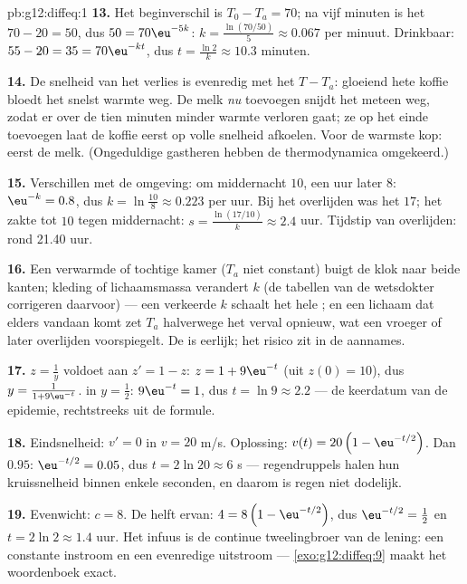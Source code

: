 \begin{solution}{pb:g12:diffeq:1}
\textbf{13.} Het beginverschil is $T_0 - T_a = 70$; na vijf minuten is het
 $70 - 20 = 50$, dus $50 = 70\eu^{-5k}$:
$k = \frac{\ln(70/50)}{5} \approx 0.067$ per minuut. Drinkbaar:
$55 - 20 = 35 = 70\eu^{-kt}$, dus $t = \frac{\ln 2}{k} \approx 10.3$
minuten.

\textbf{14.} De snelheid van het verlies is evenredig met het 
$T - T_a$: gloeiend hete koffie bloedt het snelst warmte weg. De melk
\emph{nu} toevoegen snijdt het  meteen weg, zodat er over de tien
minuten minder warmte verloren gaat; ze op het einde toevoegen laat de koffie
eerst op volle snelheid afkoelen. Voor de warmste kop: eerst de melk.
(Ongeduldige gastheren hebben de thermodynamica omgekeerd.)

\textbf{15.} Verschillen met de omgeving: om middernacht $10$, een uur later
$8$: $\eu^{-k} = 0.8$, dus $k = \ln\frac{10}{8} \approx 0.223$ per uur. Bij
het overlijden was het  $17$; het zakte tot $10$ tegen middernacht:
$s = \frac{\ln(17/10)}{k} \approx 2.4$ uur. Tijdstip van overlijden: rond
21.40 uur.

\textbf{16.} Een verwarmde of tochtige kamer ($T_a$ niet constant) buigt de
klok naar beide kanten; kleding of lichaamsmassa verandert $k$ (de tabellen
van de wetsdokter corrigeren daarvoor) --- een verkeerde $k$ schaalt het hele
; en een lichaam dat elders vandaan komt zet $T_a$ halverwege het
verval opnieuw, wat een vroeger of later overlijden voorspiegelt. De
 is eerlijk; het risico zit in de aannames.

\textbf{17.} $z = \frac1y$ voldoet aan $z' = 1 - z$: $z = 1 + 9\eu^{-t}$
(uit $z(0) = 10$), dus $y = \frac{1}{1 + 9\eu^{-t}}$.  in
$y = \frac12$: $9\eu^{-t} = 1$, dus $t = \ln 9 \approx 2.2$ --- de keerdatum
van de epidemie, rechtstreeks uit de formule.

\textbf{18.} Eindsnelheid: $v' = 0$ in $v = 20$ m/s. Oplossing:
$v(t) = 20\left(1 - \eu^{-t/2}\right)$. Dan $0.95$: $\eu^{-t/2} = 0.05$, dus
$t = 2\ln 20 \approx 6$ s --- regendruppels halen hun kruissnelheid binnen
enkele seconden, en daarom is regen niet dodelijk.

\textbf{19.} Evenwicht: $c = 8$. De helft ervan:
$4 = 8\left(1 - \eu^{-t/2}\right)$, dus $\eu^{-t/2} = \frac12$ en
$t = 2\ln 2 \approx 1.4$ uur. Het infuus is de continue tweelingbroer van de
lening: een constante instroom en een evenredige uitstroom ---
\cref{exo:g12:diffeq:9} maakt het woordenboek exact.


\end{solution}
